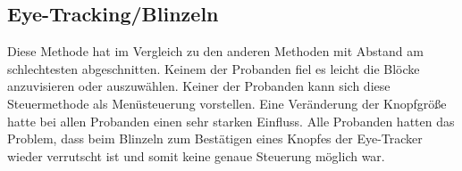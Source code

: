 \subsection{Eye-Tracking/Blinzeln}
Diese Methode hat im Vergleich zu den anderen Methoden mit Abstand am schlechtesten abgeschnitten. Keinem der Probanden fiel es leicht die Blöcke anzuvisieren oder auszuwählen. Keiner der Probanden kann sich diese Steuermethode als Menüsteuerung vorstellen. Eine Veränderung der Knopfgröße hatte bei allen Probanden einen sehr starken Einfluss. Alle Probanden hatten das Problem, dass beim Blinzeln zum Bestätigen eines Knopfes der Eye-Tracker wieder verrutscht ist und somit keine genaue Steuerung möglich war. 
